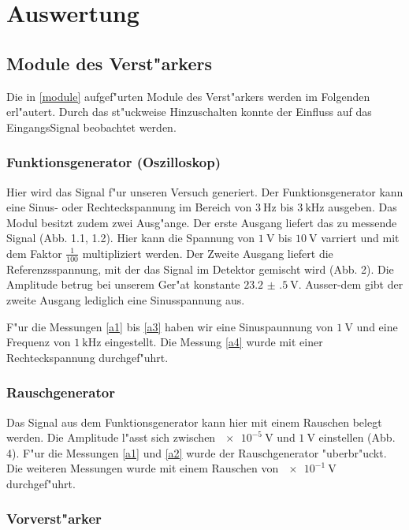 \documentclass{scrartcl}
\begin{document}
	\section{Auswertung}

		\subsection{Module des Verst"arkers}

			Die in \ref{module} aufgef"urten Module des Verst"arkers werden im Folgenden erl"autert.
			Durch das st"uckweise Hinzuschalten konnte der Einfluss auf das EingangsSignal beobachtet werden.

			\subsubsection{Funktionsgenerator (Oszilloskop)}

				Hier wird das Signal f"ur unseren Versuch generiert.
				Der Funktionsgenerator kann eine Sinus- oder Rechteckspannung im Bereich von $\SI{3}{\hertz}$ bis $\SI{3}{\kilo\hertz}$ ausgeben.
				Das Modul besitzt zudem zwei Ausg"ange. Der erste Ausgang liefert das zu messende Signal (Abb. 1.1, 1.2).
				Hier kann die Spannung von $\SI{1}{\volt}$ bis $\SI{10}{\volt}$ varriert und mit dem Faktor $\frac{1}{100}$ multipliziert werden.
				Der Zweite Ausgang liefert die Referenzsspannung, mit der das Signal im Detektor gemischt wird (Abb. 2).
				Die Amplitude betrug bei unserem Ger"at konstante $\SI{23.2(5)}{\volt}$.
				Ausser-dem gibt der zweite Ausgang lediglich eine Sinusspannung aus.

				F"ur die Messungen \ref{a1} bis \ref{a3} haben wir eine Sinuspaunnung von $\SI{1}{\volt}$ und eine Frequenz von $\SI{1}{\kilo\hertz}$ eingestellt.
				Die Messung \ref{a4} wurde mit einer Rechteckspannung durchgef"uhrt.

			\subsubsection{Rauschgenerator}

				Das Signal aus dem Funktionsgenerator kann hier mit einem Rauschen belegt werden.
				Die Amplitude l"asst sich zwischen $\SI{e-5}{\volt}$ und $\SI{1}{\volt}$ einstellen (Abb. 4).
				F"ur die Messungen \ref{a1} und \ref{a2} wurde der Rauschgenerator "uberbr"uckt. Die weiteren Messungen wurde mit einem Rauschen von $\SI{e-1}{\volt}$ durchgef"uhrt.

			\subsubsection{Vorverst"arker}
\end{document}
